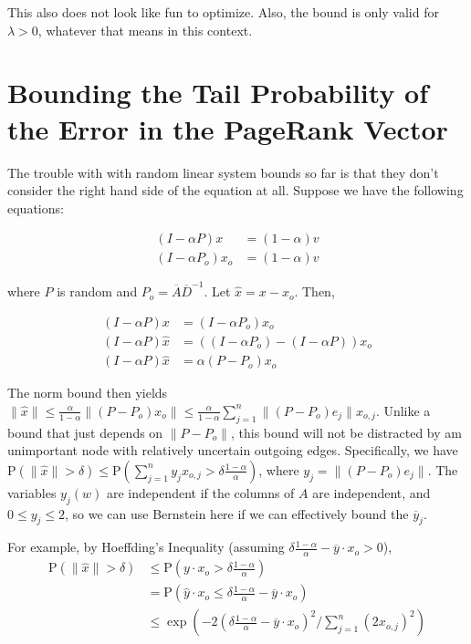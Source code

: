 \documentclass{article}
\newcommand \p[1] {\mathrm P \left(#1\right)}
\begin{document}
This also does not look like fun to optimize. Also, the bound is only valid for $\lambda > 0$, whatever that means in this context.

\section{Bounding the Tail Probability of the Error in the PageRank Vector}

The trouble with with random linear system bounds so far is that they don't consider the right hand side of the equation at all. Suppose we have the following equations:

\begin{align*}
(I-\alpha P)x &= (1-\alpha)v \\
(I-\alpha P_o)x_o &= (1-\alpha)v
\end{align*}

where $P$ is random and $P_o=\overline A \overline D^{-1}$. Let $\hat x = x - x_o$. Then,

\begin{align*}
(I-\alpha P)x &= (I-\alpha P_o)x_o \\
(I-\alpha P)\hat x &= ((I-\alpha P_o)-(I-\alpha P))x_o \\
(I-\alpha P)\hat x &= \alpha(P-P_o)x_o
\end{align*}

The norm bound then yields $\|\hat x\| \leq \frac\alpha{1-\alpha} \|(P-P_o)x_o\| \leq \frac\alpha{1-\alpha}\sum_{j=1}^n \|(P-P_o)e_j\| x_{o,j}$. Unlike a bound that just depends on $\|P-P_o\|$, this bound will not be distracted by am unimportant node with relatively uncertain outgoing edges. Specifically, we have $\p{\|\hat x\|>\delta} \leq \p{\sum_{j=1}^n y_j x_{o,j} > \delta\frac{1-\alpha}{\alpha}}$, where $y_j = \|(P-P_o)e_j\|$. The variables $y_j(w)$ are independent if the columns of $A$ are independent, and $0\leq y_j\leq 2$, so we can use Bernstein here if we can effectively bound the $\overline y_j$.

For example, by Hoeffding's Inequality (assuming $\delta\frac{1-\alpha}\alpha - \overline y \cdot x_o>0$),
\begin{align*}
\p{\|\hat x\| > \delta} &\leq \p{y\cdot x_o > \delta\frac{1-\alpha}{\alpha}} \\
&= \p{\hat y \cdot x_o \leq \delta\frac{1-\alpha}\alpha - \overline y \cdot x_o} \\
&\leq \exp\left(-2\left(\delta\frac{1-\alpha}\alpha - \overline y \cdot x_o\right)^2 \bigg/ \sum_{j=1}^n (2x_{o,j})^2 \right) \\
\end{align*}
\end{document}

